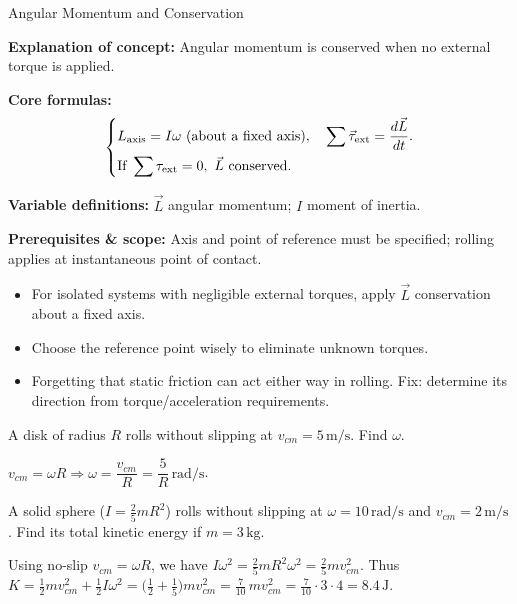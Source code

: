 \begin{KnowledgePoint}{Angular Momentum and Conservation \Core}
  \KPFormulas
  \begin{formulabox}
  \textbf{Explanation of concept:} Angular momentum is conserved when no external torque is applied.

  \textbf{Core formulas:}
  \[
  \left\{\begin{aligned}
    &L_{\rm axis}=I\omega\ (\text{about a fixed axis}),\quad \sum\vec\tau_{\text{ext}}=\frac{d\vec L}{dt}.\\
    &\text{If }\sum \tau_{\text{ext}}=0,\ \vec L\ \text{conserved}.
  \end{aligned}\right.
  \]

  \textbf{Variable definitions:} $\vec L$ angular momentum; $I$ moment of inertia.

  \textbf{Prerequisites \& scope:} Axis and point of reference must be specified; rolling applies at instantaneous point of contact.
  \end{formulabox}

  \KPHeuristics
  \begin{heuristicsbox}
  \begin{itemize}[leftmargin=*]
    \item For isolated systems with negligible external torques, apply $\vec L$ conservation about a fixed axis.
    \item Choose the reference point wisely to eliminate unknown torques.
  \end{itemize}
  \vspace{0.4em}
  \begin{itemize}[leftmargin=*]
    \item Forgetting that static friction can act either way in rolling. Fix: determine its direction from torque/acceleration requirements.
  \end{itemize}
  \end{heuristicsbox}

  \KPProblems
\begin{cheatproblem}
  A disk of radius $R$ rolls without slipping at $v_{cm}=5\,\text{m/s}$. Find $\omega$.
\begin{solutionbox}
  $v_{cm}=\omega R\Rightarrow\omega=\dfrac{v_{cm}}{R}=\dfrac{5}{R}\,\text{rad/s}$.
\end{solutionbox}
\end{cheatproblem}
\begin{cheatproblem}
  A solid sphere ($I=\tfrac25 mR^2$) rolls without slipping at $\omega=10\,\text{rad/s}$ and $v_{cm}=2\,\text{m/s}$. Find its total kinetic energy if $m=3\,\text{kg}$.
\begin{solutionbox}
  Using no-slip $v_{cm}=\omega R$, we have $I\omega^2=\tfrac25 mR^2\omega^2=\tfrac25 m v_{cm}^2$. Thus
  $K=\tfrac12 m v_{cm}^2+\tfrac12 I\omega^2=\Big(\tfrac12+\tfrac15\Big)m v_{cm}^2=\tfrac{7}{10}\,m v_{cm}^2=\tfrac{7}{10}\cdot3\cdot4=8.4\,\text{J}$.
\end{solutionbox}
\end{cheatproblem}
\end{KnowledgePoint}

